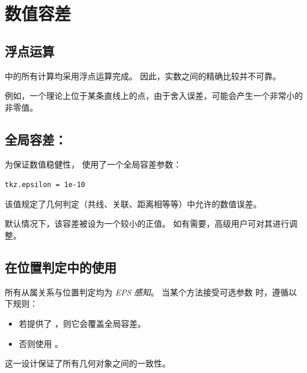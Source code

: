 \section{数值容差}
\label{sec:numerical_tolerance}

\subsection{浮点运算}

 中的所有计算均采用浮点运算完成。
因此，实数之间的精确比较并不可靠。

例如，一个理论上位于某条直线上的点，由于舍入误差，可能会产生一个非常小的非零值。

\subsection{全局容差：}

为保证数值稳健性，
使用了一个全局容差参数：


\verb|tkz.epsilon = 1e-10|


该值规定了几何判定（共线、关联、距离相等等）中允许的数值误差。

\medskip
默认情况下，该容差被设为一个较小的正值。
如有需要，高级用户可对其进行调整。

\subsection{在位置判定中的使用}

所有从属关系与位置判定均为 \emph{EPS 感知}。
当某个方法接受可选参数  时，遵循以下规则：

\begin{itemize}
\item 若提供了 ，则它会覆盖全局容差。
\item 否则使用 。
\end{itemize}

这一设计保证了所有几何对象之间的一致性。
